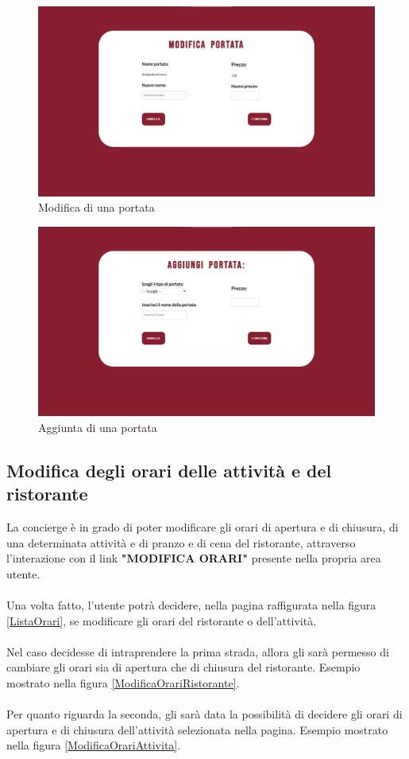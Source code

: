 \documentclass [a4paper, 12pt]{book}
\begin{document}
\begin{figure}[!h]
\centering
\includegraphics[scale=0.3]{ModificaPortata.png}
\caption{Modifica di una portata}
\label{ModificaPortata}
\end{figure}

\begin{figure}[!h]
\centering
\includegraphics[scale=0.3]{AggiungiPortata.png}
\caption{Aggiunta di una portata}
\label{AggiungiPortata}
\end{figure}

\subsection{Modifica degli orari delle attività e del ristorante}
La concierge è in grado di poter modificare gli orari di apertura e di chiusura, di una determinata attività e di pranzo e di cena del ristorante, attraverso l'interazione con il link \textbf{"MODIFICA ORARI"} presente nella propria area utente.\\\\
Una volta fatto, l'utente potrà decidere, nella pagina raffigurata nella figura \ref{ListaOrari}, se modificare gli orari del ristorante o dell'attività.\\\\ 
Nel caso decidesse di intraprendere la prima strada, allora gli sarà permesso di cambiare gli orari sia di apertura che di chiusura del ristorante. Esempio mostrato nella figura \ref{ModificaOrariRistorante}.\\\\
Per quanto riguarda la seconda, gli sarà data la possibilità di decidere gli orari di apertura e di chiusura dell'attività selezionata nella pagina. Esempio mostrato nella figura \ref{ModificaOrariAttivita}.
\end{document}
